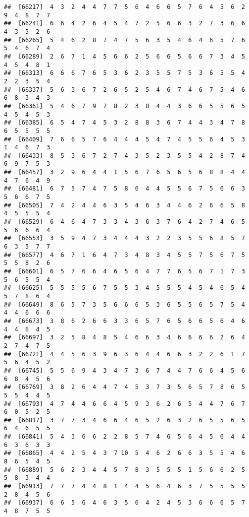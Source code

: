\documentclass[
]{book}
\begin{document}
\begin{verbatim}
##  [66217]  4  3  2  4  4  7  7  5  6  4  6  6  5  7  6  4  5  6  2  9  4  8  7  7
##  [66241]  6  6  4  2  6  4  5  4  7  2  5  6  6  3  2  7  3  6  6  4  3  5  2  6
##  [66265]  5  4  6  2  8  7  4  7  5  6  3  5  4  6  4  6  5  7  6  5  4  6  7  4
##  [66289]  2  6  7  1  4  5  6  6  2  5  6  6  5  6  6  7  3  4  5  4  5  4  8  1
##  [66313]  6  6  6  7  6  5  3  6  2  3  5  5  7  5  3  6  5  5  4  2  2  3  5  4
##  [66337]  5  6  3  6  7  2  6  5  2  5  4  6  7  4  6  7  5  4  6  6  8  3  4  3
##  [66361]  5  4  6  7  9  7  8  2  3  8  4  4  3  6  6  5  5  6  5  4  5  4  5  3
##  [66385]  6  5  4  7  4  5  3  2  8  8  3  6  7  4  4  3  4  7  8  6  5  5  5  5
##  [66409]  7  6  6  5  7  6  4  4  4  5  4  7  4  5  5  6  4  5  3  1  4  6  7  3
##  [66433]  8  5  3  6  7  2  7  4  3  5  2  3  5  5  4  2  8  7  4  6  9  7  5  3
##  [66457]  3  2  9  6  4  4  1  5  6  7  6  5  6  5  6  8  8  4  4  4  7  6  4  9
##  [66481]  6  7  5  7  4  7  5  8  6  4  4  5  5  6  7  5  6  6  3  5  6  6  7  5
##  [66505]  7  4  2  4  4  6  3  5  4  6  3  4  4  6  2  6  6  5  8  4  5  5  5  4
##  [66529]  6  4  6  4  7  3  3  4  3  6  3  7  6  4  2  7  4  6  5  5  6  6  6  4
##  [66553]  3  5  9  4  7  3  4  4  4  3  2  2  3  5  5  6  8  5  7  6  3  5  7  7
##  [66577]  4  6  7  1  6  4  7  3  4  8  3  4  5  5  7  5  6  7  5  5  5  8  2  6
##  [66601]  6  5  7  6  6  4  6  5  6  4  7  7  6  5  6  7  1  7  3  5  6  5  5  4
##  [66625]  5  5  5  5  6  7  5  5  3  4  5  5  5  4  5  4  6  5  4  5  7  8  6  4
##  [66649]  8  6  5  7  3  5  6  6  6  5  3  6  5  5  6  5  7  5  4  4  4  6  6  6
##  [66673]  3  8  6  2  6  6  3  3  6  5  7  6  5  6  6  5  6  4  6  4  4  6  4  5
##  [66697]  3  2  5  8  4  8  5  4  6  6  3  4  6  6  6  6  2  6  4  2  7  4  7  5
##  [66721]  4  4  5  6  3  9  6  3  6  4  4  6  6  3  2  2  6  1  7  5  6  4  5  2
##  [66745]  5  5  6  9  4  3  4  7  3  6  7  4  4  7  6  6  4  5  6  6  8  4  5  6
##  [66769]  3  8  2  6  4  4  7  4  5  3  7  3  5  6  5  7  8  6  5  5  5  4  4  5
##  [66793]  4  7  4  4  6  6  4  5  9  3  6  2  6  5  4  4  7  6  7  6  0  5  2  5
##  [66817]  3  7  7  3  4  6  6  4  6  5  2  6  3  2  6  5  5  6  5  6  4  6  5  5
##  [66841]  5  4  3  6  6  2  2  8  5  7  4  6  5  6  4  5  6  4  4  6  3  6  3  3
##  [66865]  4  4  2  5  4  3  7 10  5  4  6  2  6  6  3  5  5  4  6  8  6  5  4  5
##  [66889]  5  6  2  3  4  4  5  7  8  3  5  5  5  1  5  6  6  2  5  5  8  3  4  4
##  [66913]  7  7  7  4  4  8  1  4  4  5  6  4  6  3  7  5  5  5  5  2  8  4  5  6
##  [66937]  6  6  5  6  4  6  3  5  6  4  2  4  5  3  6  6  6  5  7  4  8  7  5  5

\end{verbatim}
\end{document}
